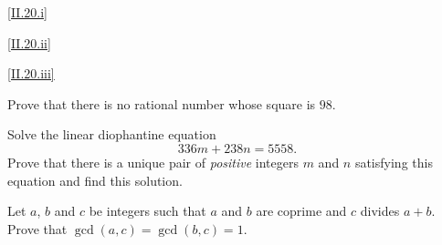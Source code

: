 \documentclass{homework}
\begin{document}
\begin{solution}
\ref{II.20.i}


\ref{II.20.ii}


\ref{II.20.iii}


\end{solution}


\begin{problem}[Eccles IV.4, p.225]
Prove that there is no rational number whose square is $98$.
\end{problem}

\begin{solution}


\end{solution}


\begin{problem}[Eccles IV.16, p.227]
Solve the linear diophantine equation
\begin{equation}
\label{eq:IV.16.1}
336m + 238 n = 5558.
\end{equation}
Prove that there is a unique pair of \emph{positive} integers $m$ and $n$
satisfying this equation and find this solution.
\end{problem}

\begin{solution}


\end{solution}


\begin{problem}
Let $a$, $b$ and $c$ be integers such that $a$ and $b$ are coprime and $c$
divides $a + b$.
Prove that $\gcd(a,c) = \gcd(b,c) = 1$.
\end{problem}

\begin{solution}


\end{solution}
\end{document}
